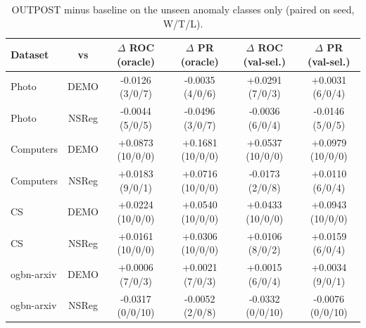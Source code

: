 \begin{table}[t]
\centering
\small
\begin{tabular}{lccccc}
\toprule
Dataset & vs & $\Delta$ ROC (oracle) & $\Delta$ PR (oracle) & $\Delta$ ROC (val-sel.) & $\Delta$ PR (val-sel.) \\
\midrule
Photo & DEMO & -0.0126 (3/0/7) & -0.0035 (4/0/6) & +0.0291 (7/0/3) & +0.0031 (6/0/4) \\
Photo & NSReg & -0.0044 (5/0/5) & -0.0496 (3/0/7) & -0.0036 (6/0/4) & -0.0146 (5/0/5) \\
Computers & DEMO & +0.0873 (10/0/0) & +0.1681 (10/0/0) & +0.0537 (10/0/0) & +0.0979 (10/0/0) \\
Computers & NSReg & +0.0183 (9/0/1) & +0.0716 (10/0/0) & -0.0173 (2/0/8) & +0.0110 (6/0/4) \\
CS & DEMO & +0.0224 (10/0/0) & +0.0540 (10/0/0) & +0.0433 (10/0/0) & +0.0943 (10/0/0) \\
CS & NSReg & +0.0161 (10/0/0) & +0.0306 (10/0/0) & +0.0106 (8/0/2) & +0.0159 (6/0/4) \\
ogbn-arxiv & DEMO & +0.0006 (7/0/3) & +0.0021 (7/0/3) & +0.0015 (6/0/4) & +0.0034 (9/0/1) \\
ogbn-arxiv & NSReg & -0.0317 (0/0/10) & -0.0052 (2/0/8) & -0.0332 (0/0/10) & -0.0076 (0/0/10) \\
\bottomrule
\end{tabular}
\caption{OUTPOST minus baseline on the unseen anomaly classes only (paired on seed, W/T/L).}
\label{tab:unseen}
\end{table}
